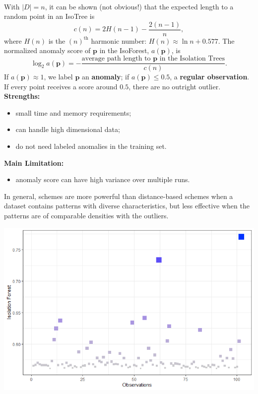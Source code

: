\documentclass[20pt,landscape,footrule,headrule]{foils}
\newcommand{\newl}{\newline\newline}
\begin{document}
{{\begin{center}
\end{center}
\newpage\ \\ \noindent 
With $|D|=n$, it can be shown (not obvious!) that the expected length to a random point in an IsoTree is 
$$
c(n) 
= 2 H(n-1) - \frac{2(n-1)}{n},
$$
where $H(n)$ is the $(n)^{\text{th}}$ harmonic number: $ H(n)\approx \ln n + 0.577.$\newl 
The normalized anomaly score of $\mathbf{p}$ in the IsoForest, $a(\mathbf{p})$,   is 
$$
\log_2 a(\mathbf{p})
= -\frac{\text{average path length to $\mathbf{p}$ in the Isolation Trees}}{c(n)}.
$$
If $a(\mathbf{p}) \approx 1$, we label $\mathbf{p}$ an \textbf{anomaly}; if  $a(\mathbf{p}) \leq 0.5$, a \textbf{regular observation}. If every point receives a score around $0.5$, there are no outright outlier. 
\newpage\ \\ \noindent \textbf{Strengths:} 
\begin{itemize}
\item small time and memory requirements;\item  can handle high dimensional data; \item do not need labeled anomalies in the training set.
\end{itemize} \textbf{Main Limitation:}
\begin{itemize}
\item anomaly score can have high variance over multiple runs.
\end{itemize}
In general,  schemes are more powerful than distance-based schemes when a dataset contains patterns with diverse characteristics, but less effective when the patterns are of comparable densities with the outliers.

\newpage
\begin{center}
\includegraphics[width=\textwidth]{Images/IsoForest}
\end{center}


}}
\end{document}
